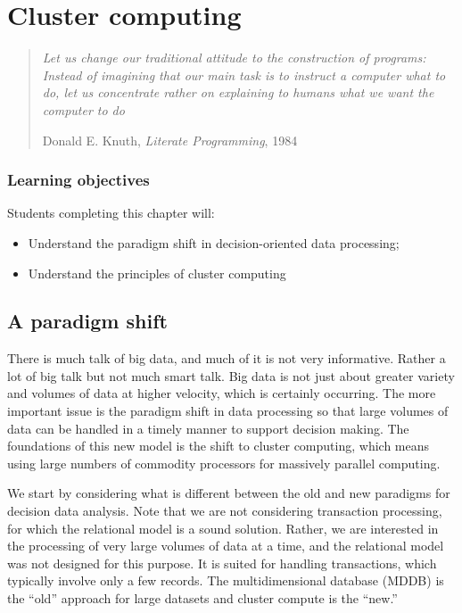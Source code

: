 \documentclass[
]{article}
\begin{document}
\hypertarget{cluster-computing}{%
\section{Cluster computing}\label{cluster-computing}}

\begin{quote}
\emph{Let us change our traditional attitude to the construction of
programs: Instead of imagining that our main task is to instruct a
computer what to do, let us concentrate rather on explaining to humans
what we want the computer to do}

Donald E. Knuth, \emph{Literate Programming}, 1984
\end{quote}

\hypertarget{learning-objectives-9}{%
\subsubsection*{Learning objectives}\label{learning-objectives-9}}

Students completing this chapter will:

\begin{itemize}
\item
  Understand the paradigm shift in decision-oriented data processing;
\item
  Understand the principles of cluster computing
\end{itemize}

\hypertarget{a-paradigm-shift}{%
\subsection*{A paradigm shift}\label{a-paradigm-shift}}

There is much talk of big data, and much of it is not very informative.
Rather a lot of big talk but not much smart talk. Big data is not just
about greater variety and volumes of data at higher velocity, which is
certainly occurring. The more important issue is the paradigm shift in
data processing so that large volumes of data can be handled in a timely
manner to support decision making. The foundations of this new model is
the shift to cluster computing, which means using large numbers of
commodity processors for massively parallel computing.

We start by considering what is different between the old and new
paradigms for decision data analysis. Note that we are not considering
transaction processing, for which the relational model is a sound
solution. Rather, we are interested in the processing of very large
volumes of data at a time, and the relational model was not designed for
this purpose. It is suited for handling transactions, which typically
involve only a few records. The multidimensional database (MDDB) is the
``old'' approach for large datasets and cluster compute is the ``new.''
\end{document}
